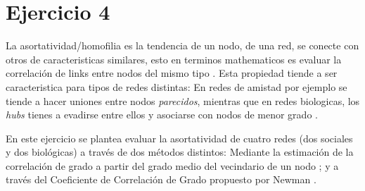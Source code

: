 \section{Ejercicio 4}
La asortatividad/homofilia es la tendencia de un nodo, de una red, se conecte con otros 
de caracteristicas similares, esto en terminos mathematicos es evaluar la correlaci\'on
de links entre nodos del mismo tipo \citep{newman2003}. Esta propiedad tiende a ser caracteristica 
para tipos de redes distintas: En redes de amistad por ejemplo se tiende a hacer uniones entre
nodos \textit{parecidos}, mientras que en redes biologicas, los \textit{hubs} tienes a evadirse 
entre ellos y asociarse con nodos de menor grado \citep{newman,barabasi}. 

En este ejercicio se plantea evaluar la asortatividad de cuatro redes (dos sociales y dos biol\'ogicas) a trav\'es
de dos m\'etodos distintos: Mediante la estimaci\'on de la correlaci\'on de grado a partir del grado medio del
vecindario de un nodo \citep{barabasi}; y a trav\'es del Coeficiente de Correlaci\'on de Grado propuesto por Newman
\citep{newman2003,newman}.

